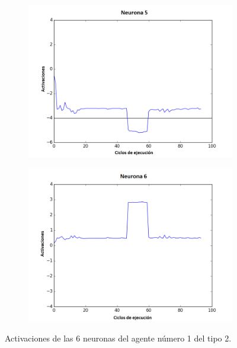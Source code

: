 \begin{figure}[!h]
\begin{subfigure}{0.33\textwidth}
  \includegraphics[width=\linewidth]{Imagenes/Agente2Activaciones/Agente0/Neurona4}
\end{subfigure}\hfil %
\begin{subfigure}{0.33\textwidth}
  \includegraphics[width=\linewidth]{Imagenes/Agente2Activaciones/Agente0/Neurona5}
\end{subfigure}
\caption{Activaciones de las 6 neuronas del agente número 1 del tipo 2.}
\end{figure}

